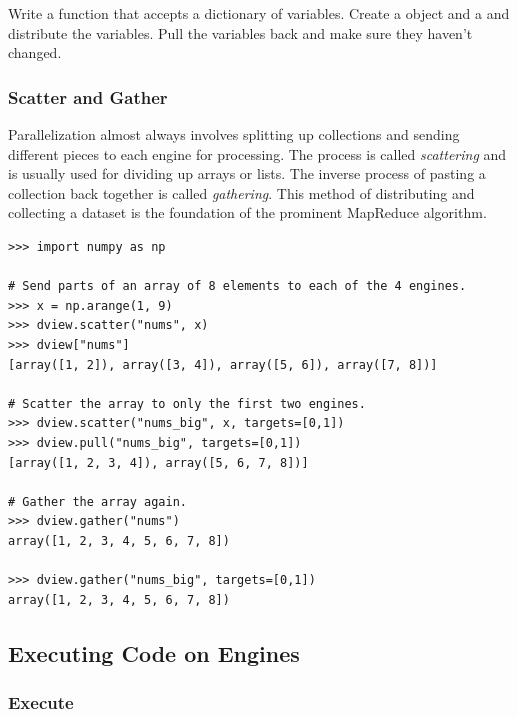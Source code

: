 \begin{problem}
Write a function  that accepts a dictionary of variables.
Create a  object and a  and distribute the variables.
Pull the variables back and make sure they haven't changed.
\end{problem}

\subsubsection*{Scatter and Gather} %

Parallelization almost always involves splitting up collections and sending different pieces to each engine for processing.
The process is called \emph{scattering} and is usually used for dividing up arrays or lists.
The inverse process of pasting a collection back together is called \emph{gathering}.
This method of distributing and collecting a dataset is the foundation of the prominent MapReduce algorithm.

\begin{lstlisting}
>>> import numpy as np

# Send parts of an array of 8 elements to each of the 4 engines.
>>> x = np.arange(1, 9)
>>> dview.scatter("nums", x)
>>> dview["nums"]
[array([1, 2]), array([3, 4]), array([5, 6]), array([7, 8])]

# Scatter the array to only the first two engines.
>>> dview.scatter("nums_big", x, targets=[0,1])
>>> dview.pull("nums_big", targets=[0,1])
[array([1, 2, 3, 4]), array([5, 6, 7, 8])]

# Gather the array again.
>>> dview.gather("nums")
array([1, 2, 3, 4, 5, 6, 7, 8])

>>> dview.gather("nums_big", targets=[0,1])
array([1, 2, 3, 4, 5, 6, 7, 8])
\end{lstlisting}

\subsection*{Executing Code on Engines} %


\subsubsection*{Execute} %

